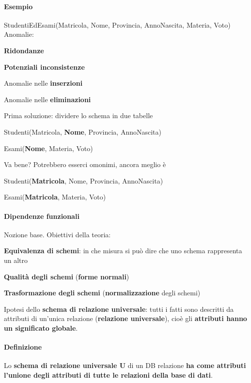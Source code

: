 \documentclass[10pt]{book}
\begin{document}
\paragraph{Esempio} StudentiEdEsami(Matricola, Nome, Provincia, AnnoNascita, Materia, Voto)\\
Anomalie:
\begin{list}{}{}
	\item \textbf{Ridondanze}
	\item \textbf{Potenziali inconsistenze}
	\item Anomalie nelle \textbf{inserzioni}
	\item Anomalie nelle \textbf{eliminazioni}
\end{list}
Prima soluzione: dividere lo schema in due tabelle
\begin{list}{}{}
	\item Studenti(Matricola, \textbf{Nome}, Provincia, AnnoNascita)
	\item Esami(\textbf{Nome}, Materia, Voto)
\end{list}
Va bene? Potrebbero esserci omonimi, ancora meglio è
\begin{list}{}{}
	\item Studenti(\textbf{Matricola}, Nome, Provincia, AnnoNascita)
	\item Esami(\textbf{Matricola}, Materia, Voto)
\end{list}
\paragraph{Dipendenze funzionali} Nozione base. Obiettivi della teoria:
\begin{list}{}{}
	\item \textbf{Equivalenza di schemi}: in che misura si può dire che uno schema rappresenta un altro
	\item \textbf{Qualità degli schemi} (\textbf{forme normali})
	\item \textbf{Trasformazione degli schemi} (\textbf{normalizzazione} degli schemi)
\end{list}
Ipotesi dello \textbf{schema di relazione universale}: tutti i fatti sono descritti da attributi di un'unica relazione (\textbf{relazione universale}), cioè gli \textbf{attributi hanno un significato globale}.
\paragraph{Definizione} Lo \textbf{schema di relazione universale U} di un DB relazione \textbf{ha come attributi l'unione degli attributi di tutte le relazioni della base di dati}.
\end{document}
